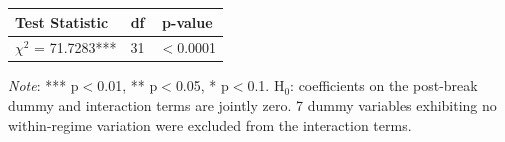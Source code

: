 \begin{tabular}{lcc}
  \toprule
  \textbf{Test Statistic} & \textbf{df} & \textbf{p-value} \\ 
  \midrule
  $\chi^2$ = 71.7283*** & 31 & $<$0.0001 \\ 
  \bottomrule
\end{tabular}
\par\vspace{4pt}
\begin{minipage}{\linewidth}
  \footnotesize \textit{Note}: *** p$<$0.01, ** p$<$0.05, * p$<$0.1. H$_0$: coefficients on the post-break dummy and interaction terms are jointly zero. 7 dummy variables exhibiting no within-regime variation were excluded from the interaction terms.
\end{minipage}